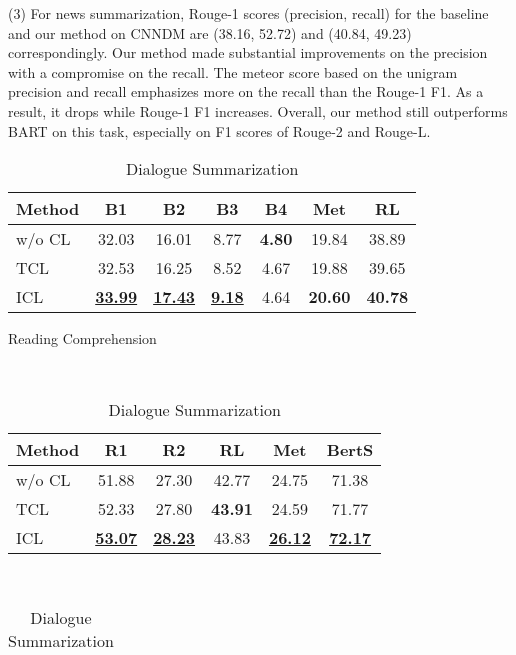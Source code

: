 (3) For news summarization, Rouge-1 scores (precision, recall) for the baseline and our method on CNNDM are (38.16, 52.72) and (40.84, 49.23) correspondingly. Our method made substantial improvements on the precision with a compromise on the recall. 
The meteor score based on the unigram precision and recall emphasizes more on the recall than the Rouge-1 F1. As a result, it drops while Rouge-1 F1 increases. Overall, our method still outperforms BART on this task, especially on F1 scores of Rouge-2 and Rouge-L.




\begin{table}[th]
	\small
	\centering
	\begin{subtable}{\linewidth}
		\scriptsize
		\centering
		\begin{tabular}{lcccccc}
			\hline
			{Method} & {B1} & {B2} & {B3} & {B4} & {Met} & {RL}\\
			\hline
			w/o CL &  32.03 & 16.01 & 8.77 & \textbf{4.80} & 19.84 & 38.89\\
			TCL & 32.53 & 16.25 & 8.52 &4.67 &19.88 & 39.65 \\
			ICL &  \underline{\textbf{33.99}} & \underline{\textbf{17.43}} & \underline{\textbf{9.18 }}& 4.64 & \textbf{20.60} & \textbf{40.78}\\

			\hline
		\end{tabular}
		\caption{Reading Comprehension}
		\label{tab:end2endrc}
	\end{subtable}
	\\[5pt]
	\begin{subtable}{\linewidth}
		\scriptsize
		\centering
		\begin{tabular}{lccccc}
			\hline
			{Method} & {R1} & {R2} & {RL} & {Met} & {BertS} \\
			\hline
			w/o CL & 51.88 & 27.30 & 42.77 & 24.75 & 71.38 \\
			TCL  & 52.33 & 27.80 & \textbf{43.91} & 24.59 & 71.77 \\
			ICL & \underline{\textbf{53.07}} & \underline{\textbf{28.23}} & {43.83} & \underline{\textbf{26.12}}& \underline{\textbf{72.17}} \\
			
			\hline
		\end{tabular}
		\caption{Dialogue Summarization}
		\label{tab:end2endds}
	\end{subtable}
	\\[5pt]
	\begin{subtable}{\linewidth}
		\scriptsize
		\centering
		\begin{tabular}{lcccccc}
			

\end{tabular}
\end{subtable}
\end{table}
